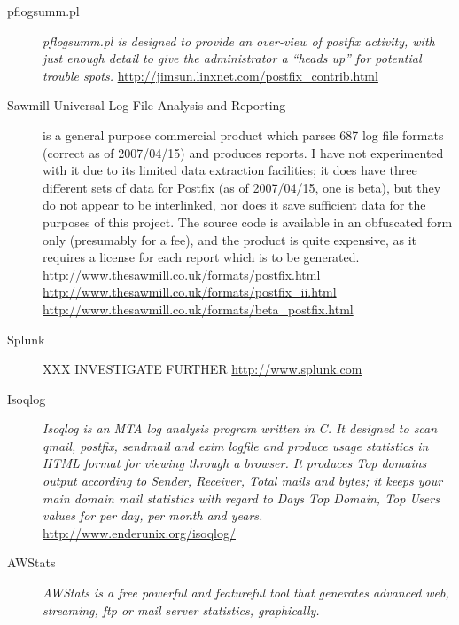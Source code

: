 \documentclass[a4paper,12pt,draft]{article}
\begin{document}
\begin{description}

    \item [pflogsumm.pl] \textit{pflogsumm.pl is designed to provide an
        over-view of postfix activity, with just enough detail to give the
        administrator a ``heads up'' for potential trouble spots.\/}
        \url{http://jimsun.linxnet.com/postfix_contrib.html}

    \item [Sawmill Universal Log File Analysis and Reporting] is a
        general purpose commercial product which parses 687 log file
        formats (correct as of 2007/04/15) and produces reports.  I have not
        experimented with it due to its limited data extraction facilities;
        it does have three different sets of data for Postfix (as of
        2007/04/15, one is beta), but they do not appear to be interlinked,
        nor does it save sufficient data for the purposes of this project.
        The source code is available in an obfuscated form only (presumably
        for a fee), and the product is quite expensive, as it requires a
        license for each report which is to be generated. \newline
        \url{http://www.thesawmill.co.uk/formats/postfix.html} \newline
        \url{http://www.thesawmill.co.uk/formats/postfix_ii.html} \newline
        \url{http://www.thesawmill.co.uk/formats/beta_postfix.html}

    \item [Splunk] XXX INVESTIGATE FURTHER \url{http://www.splunk.com}

    \item [Isoqlog] \textit{Isoqlog is an MTA log analysis program written
        in C. It designed to scan qmail, postfix, sendmail and exim logfile
        and produce usage statistics in HTML format for viewing through a
        browser. It produces Top domains output according to Sender,
        Receiver, Total mails and bytes; it keeps your main domain mail
        statistics with regard to Days Top Domain, Top Users values for per
        day, per month and years.\/}  \newline
        \url{http://www.enderunix.org/isoqlog/}

    \item [AWStats] \textit{AWStats is a free powerful and featureful tool
        that generates advanced web, streaming, ftp or mail server
        statistics, graphically.\/}
        

\end{description}
\end{document}
